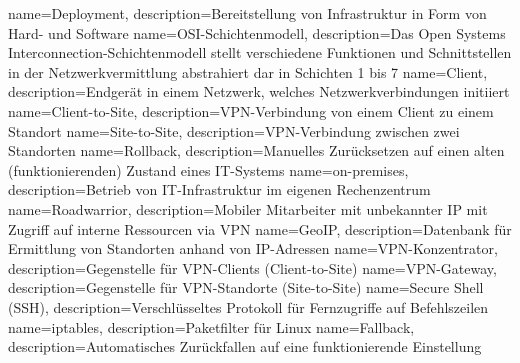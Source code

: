 {
        name=Deployment,
        description={Bereitstellung von Infrastruktur in Form von Hard- und Software}
}
{
        name=OSI-Schichtenmodell,
        description={Das Open Systems Interconnection-Schichtenmodell stellt verschiedene Funktionen und Schnittstellen in der Netzwerkvermittlung abstrahiert dar in Schichten 1 bis 7}
}
{
        name=Client,
        description={Endgerät in einem Netzwerk, welches Netzwerkverbindungen initiiert}
}
{
        name=Client-to-Site,
        description={VPN-Verbindung von einem Client zu einem Standort}
}
{
        name=Site-to-Site,
        description={VPN-Verbindung zwischen zwei Standorten}
}
{
        name=Rollback,
        description={Manuelles Zurücksetzen auf einen alten (funktionierenden) Zustand eines IT-Systems}
}
{
        name=on-premises,
        description={Betrieb von IT-Infrastruktur im eigenen Rechenzentrum}
}
{
        name=Roadwarrior,
        description={Mobiler Mitarbeiter mit unbekannter IP mit Zugriff auf interne Ressourcen via VPN}
}
{
        name=GeoIP,
        description={Datenbank für Ermittlung von Standorten anhand von IP-Adressen}
}
{
        name=VPN-Konzentrator,
        description={Gegenstelle für VPN-Clients (Client-to-Site)}
}
{
        name=VPN-Gateway,
        description={Gegenstelle für VPN-Standorte (Site-to-Site)}
}
{
        name=Secure Shell (SSH),
        description={Verschlüsseltes Protokoll für Fernzugriffe auf Befehlszeilen}
} 
{
        name=iptables,
        description={Paketfilter für Linux}
}
{
        name=Fallback,
        description={Automatisches Zurückfallen auf eine funktionierende Einstellung}
} 
